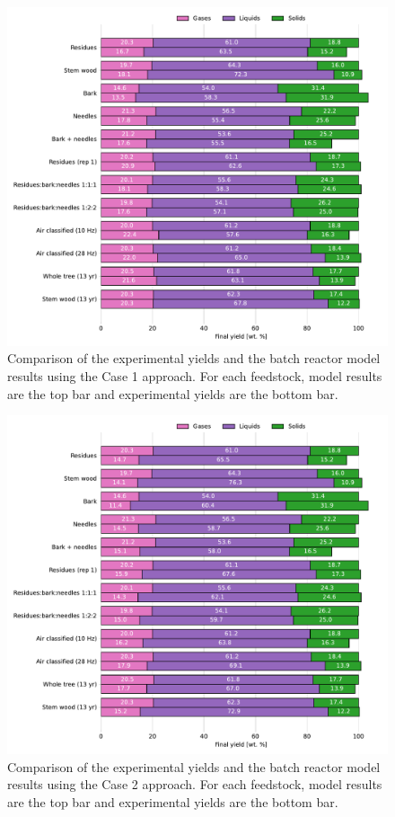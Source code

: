 \begin{figure}[H]
    \centering
    \includegraphics[width=\textwidth]{figures/batch-exp1a.pdf}
    \caption{Comparison of the experimental yields and the batch reactor model results using the Case 1 approach. For each feedstock, model results are the top bar and experimental yields are the bottom bar.}
    \label{fig:batch-exp1a}
\end{figure}

\begin{figure}[H]
    \centering
    \includegraphics[width=\textwidth]{figures/batch-exp1b.pdf}
    \caption{Comparison of the experimental yields and the batch reactor model results using the Case 2 approach. For each feedstock, model results are the top bar and experimental yields are the bottom bar.}
    \label{fig:batch-exp1b}
\end{figure}

